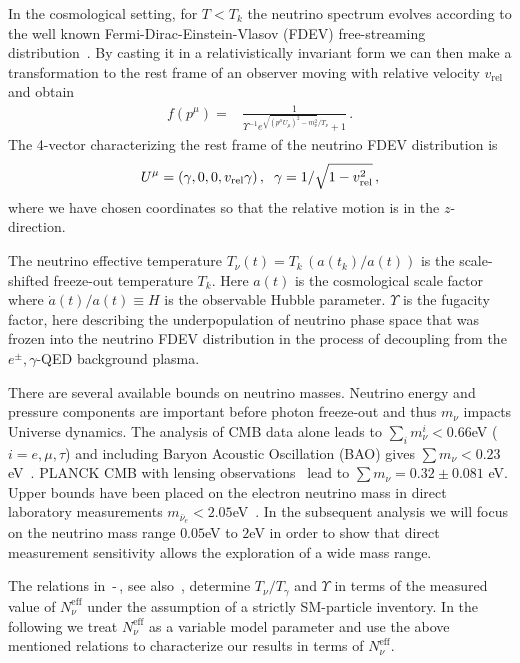 In the cosmological setting, for $T<T_k$ the neutrino spectrum evolves according to the well known Fermi-Dirac-Einstein-Vlasov (FDEV) free-streaming  distribution~\cite{Langacker:1982ih,Choquet-Bruhat:2009xil,Wong:2011ip,Birrell:2012gg}.  By casting it in a relativistically invariant form we can then make a transformation to the rest frame of an observer moving with relative velocity $v_{\text{rel}}$ and obtain
\begin{align}\label{eq:neutrinoDistB}
f(p^\mu)=&\frac{1}{\Upsilon^{-1} e^{\sqrt{(p^\mu U_\mu)^2-m_\nu^2}/T_\nu}+1}\,.
\end{align}
The 4-vector characterizing the rest frame of the neutrino FDEV distribution is
\begin{equation}
U^\mu=(\gamma,0,0,v_{\text{rel}}\gamma)\,,\hspace{2mm} \gamma={1}/{\sqrt{1-v_{\text{rel}}^2}}\,,
\end{equation} 
where we have chosen coordinates so that the relative motion is in the $z$-direction. 

The neutrino effective temperature $T_\nu(t)= T_k\,(a(t_k)/a(t))$ is the scale-shifted freeze-out temperature $T_k$. Here $a(t)$ is the cosmological scale factor where $\dot a(t)/a(t)\equiv H$ is the observable Hubble parameter. $\Upsilon$ is the  fugacity factor, here describing the underpopulation of neutrino phase space that was frozen into the neutrino FDEV distribution in the process of decoupling from the $e^\pm,\gamma$-QED background  plasma.

There are several available bounds on neutrino masses. Neutrino energy and pressure components are important before photon freeze-out and thus $m_\nu$ impacts Universe dynamics. The analysis of CMB data alone leads to $\sum_i m_\nu^i<0.66$eV ($i=e,\mu,\tau$) and including Baryon Acoustic Oscillation (BAO) gives $\sum m_\nu<0.23$eV~\cite{Planck:2013pxb}.  {\small PLANCK CMB} with lensing observations~\cite{Battye:2013xqa} lead to  $\sum m_{\nu}=0.32\pm0.081$ eV. Upper bounds have been placed on the electron neutrino mass in direct laboratory measurements  $m_{\bar\nu_e}<2.05$eV~\cite{Troitsk:2011cvm}.   In the subsequent analysis we will focus on the neutrino mass range $0.05$eV to $2$eV in order to show that direct measurement sensitivity allows the exploration of a wide mass range. 

 The relations in \,-\,, see also~\cite{Birrell:2012gg}, determine $T_\nu/T_\gamma$ and  $\Upsilon$ in terms of the measured  value of  $N_\nu^{\mathrm{eff}}$ under the assumption of a strictly SM-particle inventory.  In the following we treat $N_\nu^{\mathrm{eff}}$  as a variable model parameter and use the above mentioned relations to characterize our results in terms of $N_\nu^{\mathrm{eff}}$.


